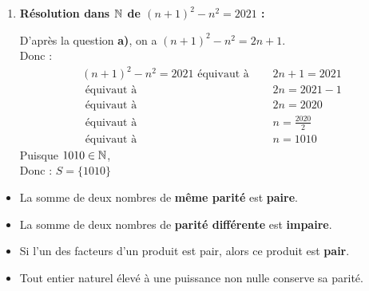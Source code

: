 \documentclass[10pt, a4paper]{article}
\begin{document}
\begin{Solution}[APPLICATION][1]
\begin{enumerate}[leftmargin=*,itemsep=0.5pt]
\begin{enumerate}[leftmargin=*,itemsep=0.5pt]
        Soit $n \in \N$,  on a :
        \begin{align*}
            (n+1)^2 - n^2 = n^2 + 2n + 1 - n^2
                          = 2n + 1
        \end{align*}

        Donc $(n+1)^2 - n^2$ est un nombre \textbf{impair}.

        \item \textbf{Résolution dans $\mathbb{N}$ de $(n+1)^2 - n^2 = 2021$ :}

        D'après la question \textbf{a)}, on a $(n+1)^2 - n^2 = 2n + 1$. \\
        Donc :
        \begin{align*}
            (n+1)^2 - n^2 = 2021 
            \text{ équivaut à } \quad & 2n + 1 = 2021 \\
            \text{ équivaut à } \quad & 2n = 2021 - 1 \\
            \text{ équivaut à } \quad & 2n = 2020 \\
            \text{ équivaut à } \quad & n = \frac{2020}{2} \\
            \text{ équivaut à } \quad & n = 1010
        \end{align*}
        Puisque $1010 \in \mathbb{N}$, \\
        Donc : \quad $S = \big\{1010\big\}$

    \end{enumerate}
\end{enumerate}
\end{Solution}

\begin{Propriete}
\begin{itemize}[leftmargin=*,itemsep=0.5pt]
  \item La somme de deux nombres de \textbf{même parité} est \textbf{paire}.
  \item La somme de deux nombres de \textbf{parité différente} est \textbf{impaire}.
  \item Si l'un des facteurs d'un produit est pair, alors ce produit est \textbf{pair}.
  \item Tout entier naturel élevé à une puissance non nulle conserve sa parité.
\end{itemize}
\end{Propriete}
\end{document}

